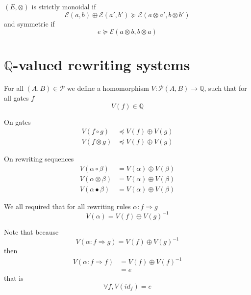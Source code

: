 \documentclass[a4paper]{article}
\begin{document}
\begin{definition}
  $(E, \otimes)$ is strictly monoidal if
  \[
    \mathcal{E}(a, b) \oplus \mathcal{E}(a', b') \succeq \mathcal{E}(a \otimes
      a', b \otimes b')
  \]
  and symmetric if
  \[
    e \succeq \mathcal{E}(a \otimes b, b \otimes a)
  \]
\end{definition}



\section{$\mathbb{Q}$-valued rewriting systems}

\begin{definition}
  For all $(A, B) \in \mathcal{P}$ we define a homomorphism $V:
    \mathcal{P}(A, B) \to \mathbb{Q}$, such that for all gates $f$
  \[
    V(f) \in \mathbb{Q}
  \]

  On gates
  \begin{align}
    V(f \circ g) &\preceq V(f) \oplus V(g) \\
    V(f \otimes g) &\preceq V(f) \oplus V(g)
  \end{align}
  
  On rewriting sequences
  \begin{align}
    V(\alpha \circ \beta) &= V(\alpha) \oplus V(\beta) \\
    V(\alpha \otimes \beta) &= V(\alpha) \oplus V(\beta) \\
    V(\alpha \bullet \beta) &= V(\alpha) \oplus V(\beta)
  \end{align}

  We all required that for all rewriting rules $\alpha: f \Rightarrow g$
  \[
    V(\alpha) = V(f) \oplus V(g)^{-1}
  \]
  
\end{definition}

\begin{remark}
  Note that because
  \[
    V(\alpha: f \Rightarrow g) = V(f) \oplus V(g)^{-1}
  \]
  then
  \begin{align}
    V(\alpha: f \Rightarrow f) &= V(f) \oplus V(f)^{-1} \\
    &= e
  \end{align}
  that is
  \[
    \forall f, V(id_f) = e
  \]
\end{remark}
\end{document}
